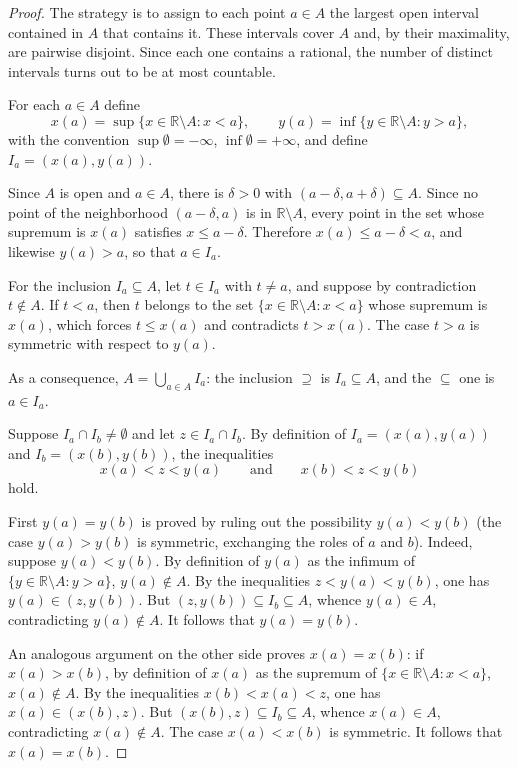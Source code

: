 \documentclass[11pt, a4paper]{article}
\begin{document}
\begin{proof}
The strategy is to assign to each point $a \in A$ the largest open interval contained in $A$ that
contains it. These intervals cover $A$ and, by their maximality, are pairwise disjoint. Since each
one contains a rational, the number of distinct intervals turns out to be at most countable.

For each $a \in A$ define
$$ x(a) = \sup\{x \in \mathbb{R} \setminus A : x < a\}, \qquad y(a) = \inf\{y \in \mathbb{R}
\setminus A : y > a\}, $$
with the convention $\sup \emptyset = -\infty$, $\inf \emptyset = +\infty$, and define
$I_a = (x(a), y(a))$.

Since $A$ is open and $a \in A$, there is $\delta > 0$ with
$(a - \delta, a + \delta) \subseteq A$. Since no point of the neighborhood $(a - \delta, a)$ is in
$\mathbb{R} \setminus A$, every point in the set whose supremum is $x(a)$ satisfies
$x \le a - \delta$. Therefore $x(a) \le a - \delta < a$, and likewise $y(a) > a$, so that
$a \in I_a$.

For the inclusion $I_a \subseteq A$, let $t \in I_a$ with $t \ne a$, and suppose by contradiction
$t \notin A$. If $t < a$, then $t$ belongs to the set $\{x \in \mathbb{R} \setminus A :
x < a\}$ whose supremum is $x(a)$, which forces $t \le x(a)$ and contradicts $t > x(a)$. The case
$t > a$ is symmetric with respect to $y(a)$.

As a consequence, $A = \bigcup_{a \in A} I_a$: the inclusion $\supseteq$ is $I_a \subseteq A$, and
the $\subseteq$ one is $a \in I_a$.

Suppose $I_a \cap I_b \ne \emptyset$ and let $z \in I_a \cap I_b$. By definition of
$I_a = (x(a), y(a))$ and $I_b = (x(b), y(b))$, the inequalities
$$ x(a) < z < y(a) \qquad \text{and} \qquad x(b) < z < y(b) $$
hold.

First $y(a) = y(b)$ is proved by ruling out the possibility $y(a) < y(b)$ (the case $y(a) > y(b)$
is symmetric, exchanging the roles of $a$ and $b$). Indeed, suppose $y(a) < y(b)$. By
definition of $y(a)$ as the infimum of $\{y \in \mathbb{R} \setminus A : y > a\}$,
$y(a) \notin A$. By the inequalities $z < y(a) < y(b)$, one has $y(a) \in (z, y(b))$. But
$(z, y(b)) \subseteq I_b \subseteq A$, whence $y(a) \in A$, contradicting $y(a) \notin A$.
It follows that $y(a) = y(b)$.

An analogous argument on the other side proves $x(a) = x(b)$: if $x(a) > x(b)$, by definition
of $x(a)$ as the supremum of $\{x \in \mathbb{R} \setminus A : x < a\}$, $x(a) \notin A$. By the
inequalities $x(b) < x(a) < z$, one has $x(a) \in (x(b), z)$. But $(x(b), z) \subseteq
I_b \subseteq A$, whence $x(a) \in A$, contradicting $x(a) \notin A$. The case $x(a) < x(b)$ is
symmetric. It follows that $x(a) = x(b)$.


\end{proof}
\end{document}
